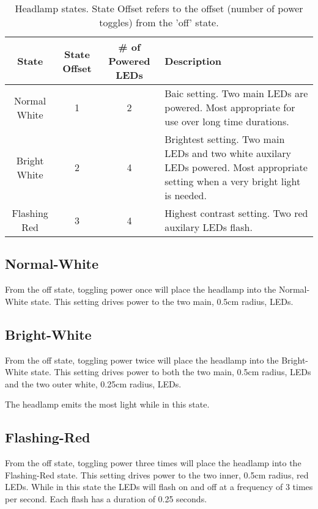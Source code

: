 \documentclass[12pt]{article}
\begin{document}
\begin{table}
\begin{tabular}{ | c | c | c | p{5cm} |}
    \hline
    State & State Offset & \# of Powered LEDs & Description \\ \hline
    Normal White & 1 & 2 &  Baic setting. Two main LEDs are powered. Most appropriate for use over
    long time durations.\\ \hline
    Bright White & 2 & 4 &  Brightest setting. Two main LEDs and two white auxilary LEDs powered.
    Most appropriate setting when a very bright light is needed.\\ \hline
    Flashing Red & 3 & 4 &  Highest contrast setting. Two red auxilary LEDs flash.\\ \hline
\end{tabular}
\caption{Headlamp states. State Offset refers to the offset (number of power toggles) from the 'off' state.}
\end{table}

\subsection{Normal-White}
From the off state, toggling power once will place the headlamp into the Normal-White state.  This
setting drives power to the two main, 0.5cm radius, LEDs.

\subsection{Bright-White}
From the off state, toggling power twice will place the headlamp into the Bright-White state.  This
setting drives power to both the two main, 0.5cm radius, LEDs and the two outer white, 0.25cm radius, LEDs.

The headlamp emits the most light while in this state.

\subsection{Flashing-Red}
From the off state, toggling power three times will place the headlamp into the Flashing-Red state.
This setting drives power to the two inner, 0.5cm radius, red LEDs. While in this state the
LEDs will flash on and off at a frequency of 3 times per second. Each flash has a duration of
0.25 seconds.
\end{document}
